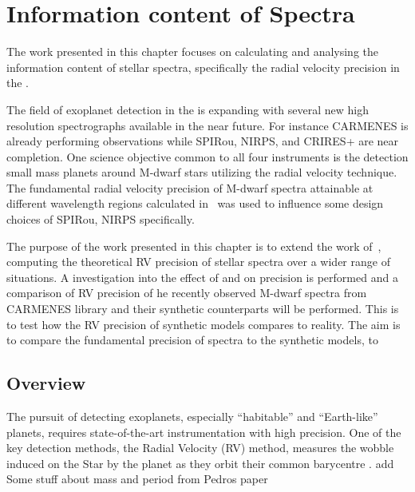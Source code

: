 
\chapter{Information content of \nir{} Spectra}
\label{cha:nir_content}

The work presented in this chapter focuses on calculating and analysing the information content of stellar spectra, specifically the radial velocity precision in the \nir{}. 

The field of exoplanet detection in the \nir{} is expanding with several new high resolution \nir{} spectrographs available in the near future.
For instance {CARMENES} is already performing observations while SPIRou, {NIRPS}, and CRIRES+ are near completion.
One science objective common to all four instruments is the detection small mass planets around {M-dwarf} stars utilizing the radial velocity technique.
The fundamental radial velocity precision of {M-dwarf} spectra attainable at different wavelength regions calculated in~\citet{figueira_radial_2016} was used to influence some design choices of SPIRou, {NIRPS} specifically.

The purpose of the work presented in this chapter is to extend the work of~\citet{figueira_radial_2016}, computing the theoretical RV precision of stellar spectra over a wider range of situations.
A investigation into the effect of \logg{} and \feh{} on precision is performed and a comparison of RV precision of he recently observed \nir{} {M-dwarf} spectra from {CARMENES} library and their synthetic counterparts will be performed.
This is to test how the {RV} precision of synthetic models compares to reality.
The aim is to compare the fundamental precision of \nir{} spectra to the synthetic models, to


\section{Overview}

The pursuit of detecting exoplanets, especially ``habitable'' and ``Earth-like'' planets, requires state-of-the-art instrumentation with high precision.
One of the key detection methods, the Radial Velocity ({RV}) method, measures the wobble induced on the Star by the planet as they orbit their common barycentre .  {\red{} add Some stuff about mass and period from Pedros paper}  



